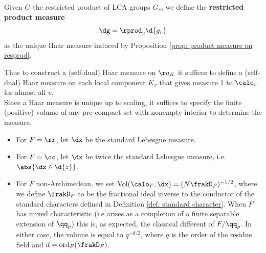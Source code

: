 \documentclass[11pt, x11names, openany]{book}
\begin{document}
\begin{defn}
\label{def: resprod measure}
Given $G$ the restricted product of LCA groups $G_v$, we define the \textbf{restricted product measure}
\begin{equation}
    \label{eqn: measure on restricted product}
        \dg = \rprod_v \d{g_v}
\end{equation}
as the unique Haar measure induced by Proposition \ref{prop: product measure on resprod}.
\end{defn}
Thus to construct a (self-dual) Haar measure on $\aa_K$ it suffices to define a (self-dual) Haar measure on each local component $K_v$ that gives measure 1 to $\calo_v$ for almost all $v$.\\
Since a Haar measure is unique up to scaling, it suffices to specify the finite (positive) volume of any pre-compact set with nonempty interior to determine the measure.
\begin{itemize}
    \item For $F = \rr$, let $\dx$ be the standard Lebesgue measure.
    \item For $F = \cc$, let $\dx$ be twice the standard Lebesgue measure, i.e. $\abs{\dz \wedge \d{\bar{z}}}$.
    \item For $F$ non-Archimedean, we set $\vol(\calo_F, \dx) = (N \frakD_F)^{-1/2}$, where we define $\frakD_F$ to be the fractional ideal inverse to the conductor of the standard characters defined in Definition \ref{def: standard character}. When $F$ has mixed characteristic (i.e arises as a completion of a finite separable extension of $\qq_p$) this is, as expected, the classical different of $F/\qq_p$. In either case, the volume is equal to $q^{-d/2}$, where $q$ is the order of the residue field and $d = \ord_F(\frakD_F)$.
\end{itemize}
\end{document}
